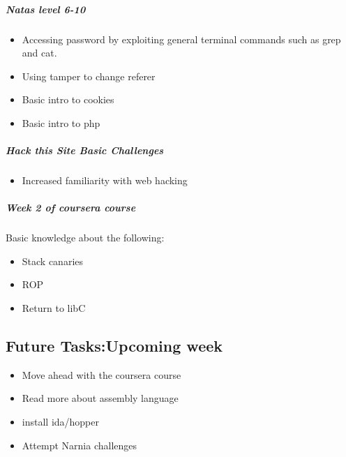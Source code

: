 \documentclass{article}
\begin{document}
\subparagraph{Natas level 6-10}
    \begin{itemize}
    \item Accessing password by exploiting general terminal commands such as grep and cat.
    \item Using tamper to change referer 
    \item Basic intro to cookies
    \item Basic intro to php
    \end{itemize}    
\subparagraph{Hack this Site Basic Challenges}
    \begin{itemize}
    \item Increased familiarity with web hacking
    \end{itemize} 
\subparagraph{Week 2 of coursera course}
    Basic knowledge about the following:
    \begin{itemize}
    \item Stack canaries
    \item ROP
    \item Return to libC
    \end{itemize} 
    
\subsection*{Future Tasks:Upcoming week}
\begin{itemize}
    \item Move ahead with the coursera course
    \item Read more about assembly language
    \item install ida/hopper
    \item Attempt Narnia challenges
\end{itemize}
\end{document}
